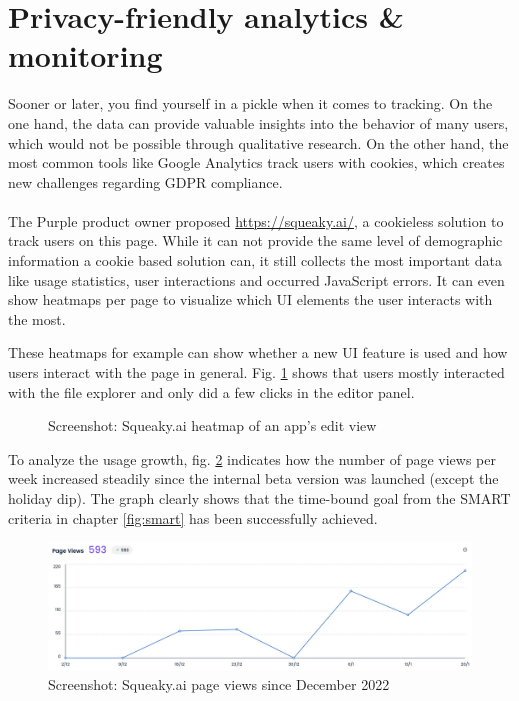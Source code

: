 \section{Privacy-friendly analytics \& monitoring}
\label{sec:analytics}

Sooner or later, you find yourself in a pickle when it comes to tracking.
On the one hand, the data can provide valuable insights into the behavior of many users, which would not be possible through qualitative research.
On the other hand, the most common tools like Google Analytics track users with cookies, which creates new challenges regarding GDPR compliance.
\\\\
The Purple product owner proposed \url{https://squeaky.ai/}, a cookieless solution to track users on this page.
While it can not provide the same level of demographic information a cookie based solution can, it still collects the most important data like usage statistics, user interactions and occurred JavaScript errors.
It can even show heatmaps per page to visualize which UI elements the user interacts with the most.

These heatmaps for example can show whether a new UI feature is used and how users interact with the page in general.
Fig. \ref{fig:squeaky} shows that users mostly interacted with the file explorer and only did a few clicks in the editor panel.
\begin{figure}[h!]
  \centering
  \caption{Screenshot: Squeaky.ai heatmap of an app's edit view}
  \label{fig:squeaky}
\end{figure}

To analyze the usage growth, fig. \ref{fig:squeaky_users} indicates how the number of page views per week increased steadily since the internal beta version was launched (except the holiday dip).
The graph clearly shows that the time-bound goal from the SMART criteria in chapter \ref{fig:smart} has been successfully achieved.

\begin{figure}[h]
  \centering
  \includegraphics[width=\textwidth]{pics/squeaky_user_curve.jpg}
  \caption{Screenshot: Squeaky.ai page views since December 2022}
  \label{fig:squeaky_users}
\end{figure}

